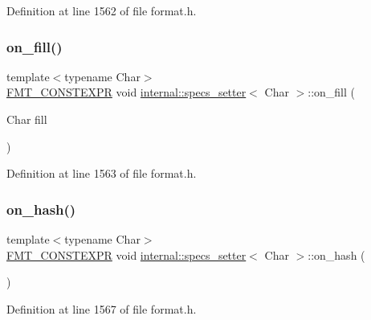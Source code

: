 Definition at line 1562 of file format.\+h.

\mbox{\label{classinternal_1_1specs__setter_a9b55facc3431eafc99a184eb6edba152}} 
\subsubsection{\texorpdfstring{on\+\_\+fill()}{on\_fill()}}
{\footnotesize\ttfamily template$<$typename Char$>$ \\
\hyperlink{core_8h_a69201cb276383873487bf68b4ef8b4cd}{F\+M\+T\+\_\+\+C\+O\+N\+S\+T\+E\+X\+PR} void \hyperlink{classinternal_1_1specs__setter}{internal\+::specs\+\_\+setter}$<$ Char $>$\+::on\+\_\+fill (\begin{DoxyParamCaption}\item[{Char}]{fill }\end{DoxyParamCaption})\hspace{0.3cm}{\ttfamily [inline]}}



Definition at line 1563 of file format.\+h.

\mbox{\label{classinternal_1_1specs__setter_a12f25749c2b49114584989052b12e3b3}} 
\subsubsection{\texorpdfstring{on\+\_\+hash()}{on\_hash()}}
{\footnotesize\ttfamily template$<$typename Char$>$ \\
\hyperlink{core_8h_a69201cb276383873487bf68b4ef8b4cd}{F\+M\+T\+\_\+\+C\+O\+N\+S\+T\+E\+X\+PR} void \hyperlink{classinternal_1_1specs__setter}{internal\+::specs\+\_\+setter}$<$ Char $>$\+::on\+\_\+hash (\begin{DoxyParamCaption}{ }\end{DoxyParamCaption})\hspace{0.3cm}{\ttfamily [inline]}}



Definition at line 1567 of file format.\+h.

